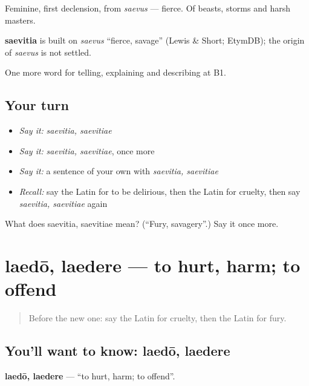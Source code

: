 Feminine, first declension, from \emph{saevus} — fierce. Of beasts, storms and harsh masters.

\begin{cousinweb}
\textbf{saevitia} is built on \emph{saevus} \textquotedblleft{}fierce, savage\textquotedblright{} (Lewis \& Short; EtymDB); the origin of \emph{saevus} is not settled.
\end{cousinweb}

\begin{grammarlens}[title={What you've built}]
One more word for telling, explaining and describing at B1.
\end{grammarlens}

\subsection*{Your turn}
\begin{itemize}
\raggedright
  \item \emph{Say it:} \emph{saevitia, saevitiae}
  \item \emph{Say it:} \emph{saevitia, saevitiae}, once more
  \item \emph{Say it:} a sentence of your own with \emph{saevitia, saevitiae}
  \item \emph{Recall:} say the Latin for to be delirious, then the Latin for cruelty, then say \emph{saevitia, saevitiae} again
\end{itemize}

\begin{tcolorbox}[breakable,colback=teal!4,colframe=teal!35!black,title={Before you move on}]
What does saevitia, saevitiae mean? (\textquotedblleft{}Fury, savagery\textquotedblright{}.) Say it once more.
\end{tcolorbox}
\section[laedō, laedere]{laedō, laedere — to hurt, harm; to offend}

\label{lesson:LA-C511-laedo}



\begin{quote}
Before the new one: say the Latin for cruelty, then the Latin for fury.
\end{quote}

\subsection*{You'll want to know: laedō, laedere}
\textbf{laedō, laedere} — \textquotedblleft{}to hurt, harm; to offend\textquotedblright{}.

